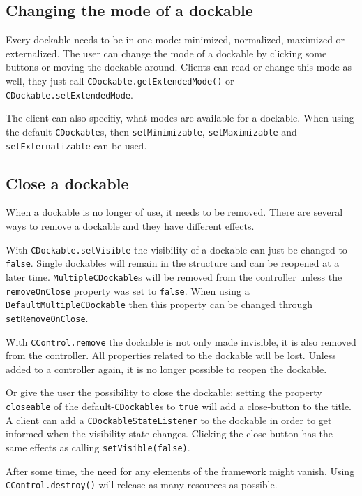 \documentclass[a4paper,10pt]{article}
\newcommand{\src}[1]{\lstinline[basicstyle=\ttfamily]|#1|}
\begin{document}
\subsection{Changing the mode of a dockable}
Every dockable needs to be in one mode: minimized, normalized, maximized or externalized. The user can change the mode of a dockable by clicking some buttons or moving the dockable around. Clients can read or change this mode as well, they just call \src{CDockable.getExtendedMode()} or \src{CDockable.setExtendedMode}.

The client can also specifiy, what modes are available for a dockable. When using the default-\src{CDockable}s, then \src{setMinimizable}, \src{setMaximizable} and \\\src{setExternalizable} can be used.

\subsection{Close a dockable}
When a dockable is no longer of use, it needs to be removed. There are several ways to remove a dockable and they have different effects.

With \src{CDockable.setVisible} the visibility of a dockable can just be changed to \src{false}. Single dockables will remain in the structure and can be reopened at a later time. \src{MultipleCDockable}s will be removed from the controller unless the \src{removeOnClose} property was set to \src{false}. When using a \\\src{DefaultMultipleCDockable} then this property can be changed through \\\src{setRemoveOnClose}.

With \src{CControl.remove} the dockable is not only made invisible, it is also removed from the controller. All properties related to the dockable will be lost. Unless added to a controller again, it is no longer possible to reopen the dockable.

Or give the user the possibility to close the dockable: setting the property \src{closeable} of the default-\src{CDockable}s to \src{true} will add a close-button to the title. A client can add a \src{CDockableStateListener} to the dockable in order to get informed when the visibility state changes. Clicking the close-button has the same effects as calling \src{setVisible(false)}.

After some time, the need for any elements of the framework might vanish. Using \src{CControl.destroy()} will release as many resources as possible.
\end{document}
